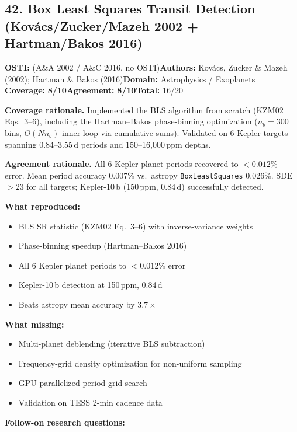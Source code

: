\documentclass[11pt]{article}
\newcommand{\scorebadge}[2]{\textbf{#1:} \textbf{#2/10}}
\begin{document}
\subsection{42. Box Least Squares Transit Detection (Kovács/Zucker/Mazeh 2002 + Hartman/Bakos 2016)}
\textbf{OSTI:} (A\&A 2002 / A\&C 2016, no OSTI)\quad\textbf{Authors:} Kovács, Zucker \& Mazeh (2002); Hartman \& Bakos (2016)\quad\textbf{Domain:} Astrophysics / Exoplanets\\
\scorebadge{Coverage}{8}\quad\scorebadge{Agreement}{8}\quad\textbf{Total:} 16/20\par\smallskip
\noindent\textbf{Coverage rationale.} Implemented the BLS algorithm from scratch (KZM02 Eqs.~3--6), including the Hartman--Bakos phase-binning optimization ($n_b=300$ bins, $O(N n_b)$ inner loop via cumulative sums). Validated on 6 Kepler targets spanning 0.84--3.55\,d periods and 150--16,000\,ppm depths.\par
\noindent\textbf{Agreement rationale.} All 6 Kepler planet periods recovered to $<0.012\%$ error. Mean period accuracy 0.007\% vs.\ astropy \texttt{BoxLeastSquares} 0.026\%. SDE $>23$ for all targets; Kepler-10\,b (150\,ppm, 0.84\,d) successfully detected.\par\smallskip
\noindent\textbf{What reproduced:}
\begin{itemize}[leftmargin=1.4em,itemsep=0.2em,topsep=0.2em]
\item BLS SR statistic (KZM02 Eq.~3--6) with inverse-variance weights
\item Phase-binning speedup (Hartman--Bakos 2016)
\item All 6 Kepler planet periods to $<0.012\%$ error
\item Kepler-10\,b detection at 150\,ppm, 0.84\,d
\item Beats astropy mean accuracy by $3.7\times$
\end{itemize}
\noindent\textbf{What missing:}
\begin{itemize}[leftmargin=1.4em,itemsep=0.2em,topsep=0.2em]
\item Multi-planet deblending (iterative BLS subtraction)
\item Frequency-grid density optimization for non-uniform sampling
\item GPU-parallelized period grid search
\item Validation on TESS 2-min cadence data
\end{itemize}
\noindent\textbf{Follow-on research questions:}
\end{document}
